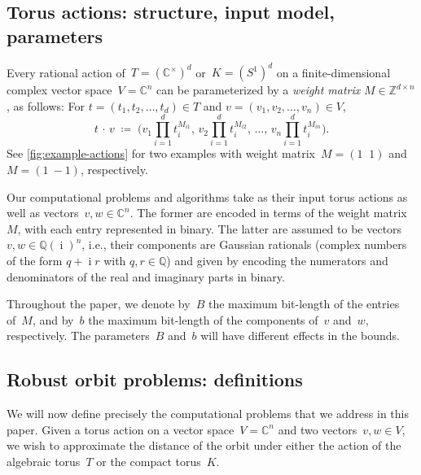 \documentclass[10pt,a4paper]{article}
\theoremstyle{definition}
\DeclareMathOperator{\ii}{i}
\newcommand{\QQ}{\mathbb{Q}}
\newcommand{\CC}{\mathbb{C}}
\newcommand{\ZZ}{\mathbb{Z}}
\numberwithin{equation}{section}
\begin{document}
\subsection{Torus actions: structure, input model, parameters}\label{subsec:structure and input}
Every rational
action of~$T = (\CC^\times)^d$ or~$K = (S^1)^d$ on a finite-dimensional complex vector space~$V=\CC^n$
can be parameterized by a \emph{weight matrix} $M\in\ZZ^{d\times n}$, as follows:
For $t=(t_1,t_2,\dots,t_d)\in T$ and $v=(v_1,v_2,\dots,v_n)\in V$,
\begin{equation}\label{eq:def-action}
  t\,\cdot\, v \; \coloneqq \; \bigg( v_1 \prod_{i=1}^d t_i^{M_{i1}},\, v_2 \prod_{i=1}^d t_i^{M_{i2}},\,
     \dots,\, v_n \prod_{i=1}^d t_i^{M_{in}} \bigg).
\end{equation}
See \cref{fig:example-actions} for two examples with weight matrix~$M=(1 \;\; 1)$ and $M = (1 \ -\!1)$, respectively.

Our computational problems and algorithms take as their input torus actions as well as vectors~$v,w\in\CC^n$.
The former are encoded in terms of the weight matrix~$M$, with each entry represented in binary.
The latter are assumed to be vectors~$v,w \in \QQ(\ii)^n$, i.e., their components are Gaussian rationals
(complex numbers of the form $q + \ii r$ with $q,r\in\QQ$)
and given by encoding the numerators and denominators of the real and imaginary parts in binary.

Throughout the paper, we denote by~$B$ the maximum bit-length of the entries of~$M$, and by~$b$
the maximum bit-length of the components of~$v$ and~$w$, respectively.
The parameters~$B$ and~$b$ will have different effects in the bounds.


\subsection{Robust orbit problems: definitions}\label{subsec:intro defs}

We will now define precisely the computational problems that we address in this paper.
Given a torus action on a vector space~$V=\CC^n$ and two vectors~$v,w\in V$,
we wish to approximate the distance of the orbit under either the action of the algebraic torus~$T$
or the compact torus~$K$.
\end{document}
